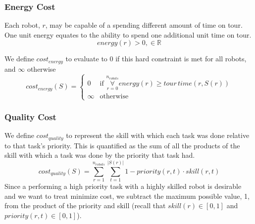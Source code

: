 \documentclass[a4paper]{article}
\begin{document}
\subsubsection{Energy Cost}

Each robot, $r$, may be capable of a spending different amount of time on tour. One unit energy equates to the ability to spend one additional unit time on tour.
$$\mathit{energy}(r) > 0, \in \mathbb{R}$$

We define $\mathit{cost}_\mathit{energy}$ to evaluate to 0 if this hard constraint is met for all robots, and $\infty$ otherwise
$$
\mathit{cost}_\mathit{energy}(S) = \begin{cases}
0 & \text{if } \mathop{\forall}\limits_{r=0}^{n_\mathit{robots}} \mathit{energy}(r) \geq \mathit{tour \, time}(r, S(r)) \\
\infty & \text{otherwise}
\end{cases}
$$

\subsubsection{Quality Cost}

We define $\mathit{cost}_\mathit{quality}$ to represent the skill with which each task was done relative to that task's priority. This is quantified as the sum of all the products of the skill with which a task was done by the priority that task had.
$$
\mathit{cost}_\mathit{quality}(S) =
  \sum^{n_\mathit{robots}}_{r=1}
  \sum^{|S(r)|}_{t=1}
  1 - \mathit{priority}(r, t) \cdot \mathit{skill}(r, t)
$$
Since a performing a high priority task with a highly skilled robot is desirable and we want to treat minimize cost, we subtract the maximum possible value, 1, from the product of the priority and skill (recall that $\mathit{skill}(r) \in [0, 1]$ and $\mathit{priority}(r, t) \in [0, 1]$).



\end{document}
